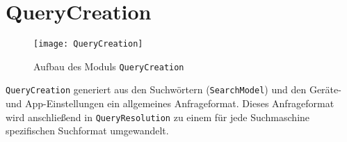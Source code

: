 
\section{QueryCreation}

\begin{figure}[htb]
   \centering
  	\texttt{[image: QueryCreation]}
  	\caption{Aufbau des Moduls \lstinline|QueryCreation|}
\end{figure}

\lstinline|QueryCreation| generiert aus den Suchwörtern (\lstinline|SearchModel|) und den Geräte- und App-Einstellungen ein allgemeines Anfrageformat. Dieses Anfrageformat wird anschließend in \lstinline|QueryResolution| zu einem für jede Suchmaschine spezifischen Suchformat umgewandelt.